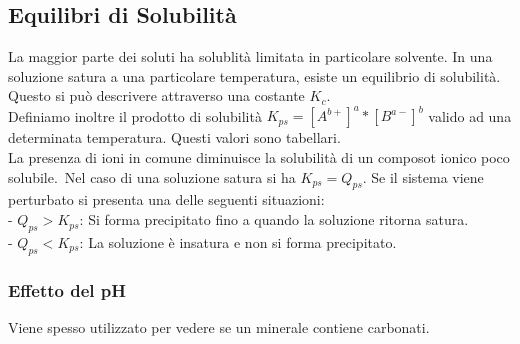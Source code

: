 \subsection{Equilibri di Solubilità}
La maggior parte dei soluti ha solublità limitata in particolare solvente. In una soluzione satura a una particolare temperatura, esiste un equilibrio di solubilità. Questo si può descrivere attraverso una costante $K_c$.\\
Definiamo inoltre il prodotto di solubilità $K_{ps} = \left[A^{b+}\right]^a*\left[B^{a-}\right]^b$ valido ad una determinata temperatura. Questi valori sono tabellari.\\
La presenza di ioni in comune diminuisce la solubilità di un composot ionico poco solubile.\
Nel caso di una soluzione satura si ha $K_{ps} = Q_{ps}$. Se il sistema viene perturbato si presenta una delle seguenti situazioni:\\
\tab- $Q_{ps} > K_{ps}$: Si forma precipitato fino a quando la soluzione ritorna satura.\\
\tab- $Q_{ps} < K_{ps}$: La soluzione è insatura e non si forma precipitato.
\subsubsection{Effetto del pH}
Viene spesso utilizzato per vedere se un minerale contiene carbonati.
